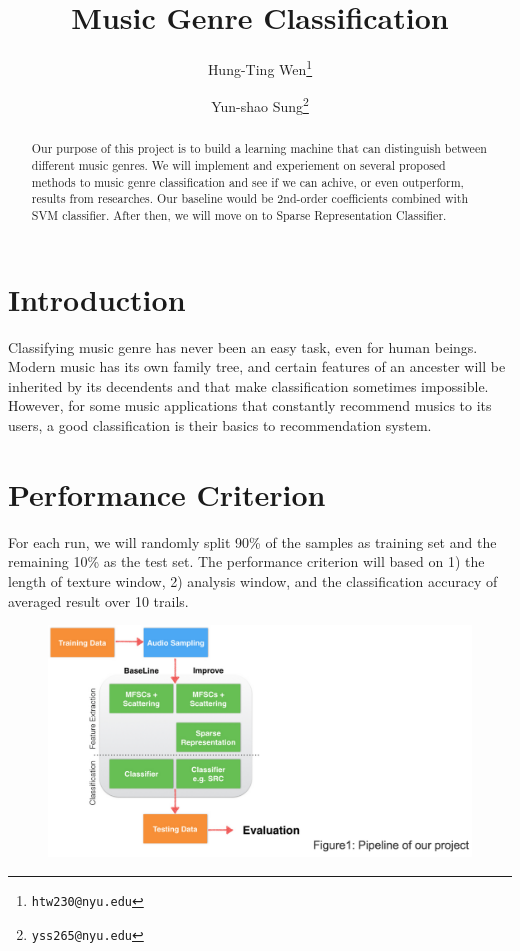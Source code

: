\documentclass[final]{siamltexmm}
\title{Music Genre Classification}
\author{Hung-Ting Wen\thanks{\tt htw230@nyu.edu}
        \and Yun-shao Sung\thanks{\tt yss265@nyu.edu}}
\begin{document}
\maketitle

\begin{abstract}
Our purpose of this project is to build a learning machine that can distinguish between different music genres.  We will implement and experiement on several proposed methods to music genre classification and see if we can achive, or even outperform, results from researches.  Our baseline would be 2nd-order coefficients combined with SVM classifier.  After then, we will move on to Sparse Representation Classifier.
\end{abstract}

\pagestyle{myheadings}
\thispagestyle{plain}

\section{Introduction}
Classifying music genre has never been an easy task, even for human beings.  Modern music has its own family tree, and certain features of an ancester will be inherited by its decendents and that make classification sometimes impossible.  However, for some music applications that constantly recommend musics to its users, a good classification is their basics to recommendation system.

\section{Performance Criterion}
For each run, we will randomly split 90\% of the samples as training set and the remaining 10\% as the test set. The performance criterion will based on 1) the length of texture window, 2) analysis window, and the classification accuracy of averaged result over 10 trails.

\begin{figure}[ht]
\begin{center}
  \includegraphics[scale=0.3]{Figure1.png}
\end{center}
\end{figure}
\end{document}
